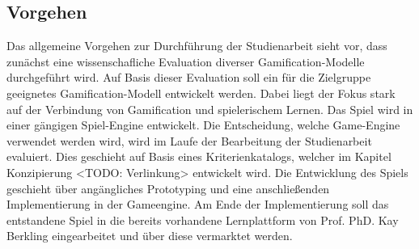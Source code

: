 \subsection{Vorgehen}
	Das allgemeine Vorgehen zur Durchführung der Studienarbeit sieht vor, dass zunächst eine wissenschafliche Evaluation diverser Gamification-Modelle durchgeführt wird. Auf Basis dieser Evaluation soll ein für die Zielgruppe geeignetes Gamification-Modell entwickelt werden. Dabei liegt der Fokus stark auf der Verbindung von Gamification und spielerischem Lernen.
	Das Spiel wird in einer gängigen Spiel-Engine entwickelt. Die Entscheidung, welche Game-Engine verwendet werden wird, wird im Laufe der Bearbeitung der Studienarbeit evaluiert. Dies geschieht auf Basis eines Kriterienkatalogs, welcher im Kapitel Konzipierung <TODO: Verlinkung> entwickelt wird.
	Die Entwicklung des Spiels geschieht über angängliches Prototyping und eine anschließenden Implementierung in der Gameengine. Am Ende der Implementierung soll das entstandene Spiel in die bereits vorhandene Lernplattform von Prof. PhD. Kay Berkling eingearbeitet und über diese vermarktet werden.
